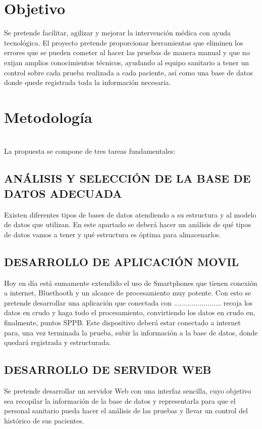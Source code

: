 \documentclass[12pt,oneside,a4paper]{article}
\begin{document}
\section{Objetivo}
\hline
Se pretende  facilitar, agilizar y mejorar la intervención médica con ayuda tecnológica. El proyecto pretende proporcionar herramientas que eliminen los errores que se pueden cometer al hacer las pruebas de manera manual y que no exijan amplios conocimientos técnicos, ayudando al equipo sanitario a tener un control sobre cada prueba realizada a cada paciente, así como una base de datos donde quede registrada toda la información necesaria.


\section{Metodología} \\
\hline
La propuesta se compone de tres tareas fundamentales: 

\subsection{ANÁLISIS Y SELECCIÓN DE LA BASE DE DATOS ADECUADA}
Existen diferentes tipos de bases de datos atendiendo a su estructura y al modelo de datos que utilizan. En este apartado se deberá hacer un análisis de qué tipos de datos vamos a tener y qué estructura es óptima para almacenarlos.

\subsection{DESARROLLO DE APLICACIÓN MOVIL}
Hoy en día está sumamente extendido el uso de Smartphones que tienen conexión a internet, Bluethooth y un alcance de procesamiento muy potente. Con esto se pretende desarrollar una aplicación que conectada con ........................ recoja los datos en crudo y haga todo el procesamiento, convirtiendo los datos en crudo en, finalmente, puntos SPPB. Este dispositivo deberá estar conectado a internet para, una vez terminada la prueba, subir la información a la base de datos, donde quedará registrada y estructurada.

\subsection{DESARROLLO DE SERVIDOR WEB} 
Se pretende desarrollar un servidor Web con una interfaz sencilla, cuyo objetivo sea recopilar la información de la base de datos y representarla para que el personal sanitario pueda hacer el análisis de las pruebas y llevar un control del histórico de sus pacientes. \\
\end{document}
